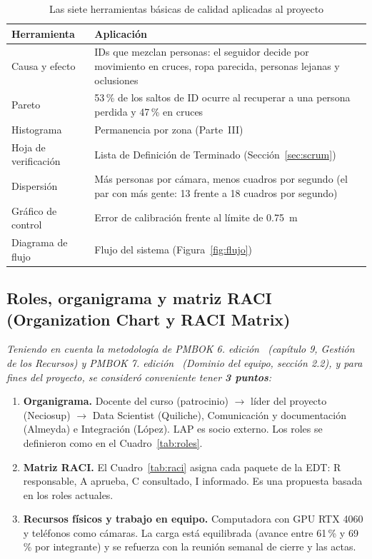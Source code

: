 \documentclass[12pt,a4paper]{article}
\begin{document}
\begin{table}[H]
\centering
\caption{Las siete herramientas básicas de calidad aplicadas al proyecto}
\label{tab:siete-herramientas}
\footnotesize
\renewcommand{\arraystretch}{1.15}
\begin{tabular}{|L{0.22\textwidth}|L{0.60\textwidth}|}
\hline
\textbf{Herramienta} & \textbf{Aplicación} \\
\hline
Causa y efecto & IDs que mezclan personas: el seguidor decide por movimiento en cruces, ropa parecida, personas lejanas y oclusiones \\
\hline
Pareto & 53\,\% de los saltos de ID ocurre al recuperar a una persona perdida y 47\,\% en cruces \\
\hline
Histograma & Permanencia por zona (Parte~III) \\
\hline
Hoja de verificación & Lista de Definición de Terminado (Sección~\ref{sec:scrum}) \\
\hline
Dispersión & Más personas por cámara, menos cuadros por segundo (el par con más gente: 13 frente a 18 cuadros por segundo) \\
\hline
Gráfico de control & Error de calibración frente al límite de 0.75~m \\
\hline
Diagrama de flujo & Flujo del sistema (Figura~\ref{fig:flujo}) \\
\hline
\end{tabular}
\end{table}

\subsection{Roles, organigrama y matriz RACI (Organization Chart y RACI Matrix)}
\label{sec:roles}

\textit{Teniendo en cuenta la metodología de PMBOK 6.\textordfeminine{} edición~\cite{pmbok6}
(capítulo 9, Gestión de los Recursos) y PMBOK 7.\textordfeminine{} edición~\cite{pmbok7}
(Dominio del equipo, sección 2.2), y para fines del proyecto, se consideró
conveniente tener \textbf{3 puntos}:}

\begin{enumerate}
    \item \textbf{Organigrama.} Docente del curso (patrocinio)
    $\rightarrow$ líder del proyecto (Neciosup) $\rightarrow$ Data Scientist
    (Quiliche), Comunicación y documentación (Almeyda) e Integración (López).
    LAP es socio externo. Los roles se definieron como en el
    Cuadro~\ref{tab:roles}.

    \item \textbf{Matriz RACI.} El Cuadro~\ref{tab:raci} asigna cada paquete de
    la EDT: R responsable, A aprueba, C consultado, I informado. Es una
    propuesta basada en los roles actuales.

    \item \textbf{Recursos físicos y trabajo en equipo.} Computadora con GPU
    RTX 4060 y teléfonos como cámaras. La carga está equilibrada (avance entre
    61\,\% y 69\,\% por integrante) y se refuerza con la reunión semanal de
    cierre y las actas.
\end{enumerate}
\end{document}
